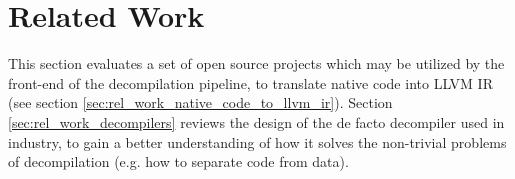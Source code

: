 
\section{Related Work}
\label{sec:related_work}

This section evaluates a set of open source projects which may be utilized by the front-end of the decompilation pipeline, to translate native code into LLVM IR (see section \ref{sec:rel_work_native_code_to_llvm_ir}). Section \ref{sec:rel_work_decompilers} reviews the design of the de facto decompiler used in industry, to gain a better understanding of how it solves the non-trivial problems of decompilation (e.g. how to separate code from data).




